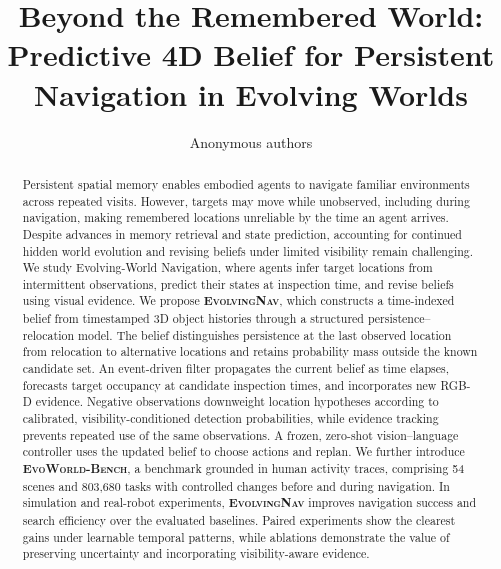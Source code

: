 \documentclass{article}
\title{Beyond the Remembered World: Predictive 4D Belief for Persistent Navigation in Evolving Worlds}
\author{Anonymous authors}
\newcommand{\evolvingworldbench}{\textsc{EvoWorld-Bench}}
\newcommand{\evolvingworldnav}{\textsc{EvolvingNav}}
\begin{document}
\maketitle

\begin{abstract}
Persistent spatial memory enables embodied agents to navigate familiar environments across repeated visits. However, targets may move while unobserved, including during navigation, making remembered locations unreliable by the time an agent arrives. Despite advances in memory retrieval and state prediction, accounting for continued hidden world evolution and revising beliefs under limited visibility remain challenging.
We study Evolving-World Navigation, where agents infer target locations from intermittent observations, predict their states at inspection time, and revise beliefs using visual evidence.
We propose \textbf{\evolvingworldnav{}}, which constructs a time-indexed belief from timestamped 3D object histories through a structured persistence--relocation model. The belief distinguishes persistence at the last observed location from relocation to alternative locations and retains probability mass outside the known candidate set.
An event-driven filter propagates the current belief as time elapses, forecasts target occupancy at candidate inspection times, and incorporates new RGB-D evidence.
Negative observations downweight location hypotheses according to calibrated, visibility-conditioned detection probabilities, while evidence tracking prevents repeated use of the same observations.
A frozen, zero-shot vision--language controller uses the updated belief to choose actions and replan.
We further introduce \textbf{\evolvingworldbench{}}, a benchmark grounded in human activity traces, comprising 54 scenes and 803,680 tasks with controlled changes before and during navigation.
In simulation and real-robot experiments, \textbf{\evolvingworldnav{}} improves navigation success and search efficiency over the evaluated baselines.
Paired experiments show the clearest gains under learnable temporal patterns, while ablations demonstrate the value of preserving uncertainty and incorporating visibility-aware evidence.

\end{abstract}
\end{document}
